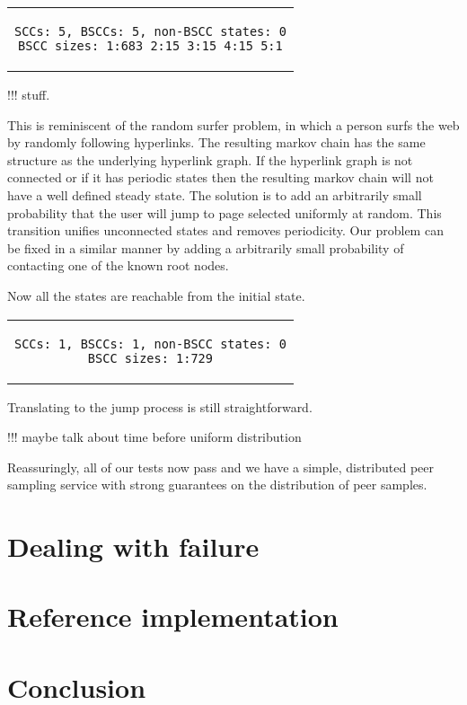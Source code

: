 \documentclass[a4paper,10pt]{article}
\newcommand{\prismmodel}[1]{
  \begin{quotation}
  \footnotesize
  
  \end{quotation}
}
\newenvironment{prismprop}[0]{
  \begin{center}
  \begin{tabular}{c}
  \footnotesize
}{
  \end{tabular}
  \end{center}
}
\begin{document}
\begin{prismprop}
\begin{lstlisting}
SCCs: 5, BSCCs: 5, non-BSCC states: 0
BSCC sizes: 1:683 2:15 3:15 4:15 5:1
\end{lstlisting}
\end{prismprop}

!!! stuff. 

This is reminiscent of the random surfer problem, in which a person surfs the web by randomly following hyperlinks. The resulting markov chain has the same structure as the underlying hyperlink graph. If the hyperlink graph is not connected or if it has periodic states then the resulting markov chain will not have a well defined steady state. The solution is to add an arbitrarily small probability that the user will jump to page selected uniformly at random. This transition unifies unconnected states and removes periodicity. Our problem can be fixed in a similar manner by adding a arbitrarily small probability of contacting one of the known root nodes.

\prismmodel{ctmc_full}

Now all the states are reachable from the initial state.

\begin{prismprop}
\begin{lstlisting}
SCCs: 1, BSCCs: 1, non-BSCC states: 0
BSCC sizes: 1:729
\end{lstlisting}
\end{prismprop}

Translating to the jump process is still straightforward.

\prismmodel{dtmc_full}

!!! maybe talk about time before uniform distribution

Reassuringly, all of our tests now pass and we have a simple, distributed peer sampling service with strong guarantees on the distribution of peer samples. 

\section{Dealing with failure}

\section{Reference implementation}

\section{Conclusion}
\end{document}
